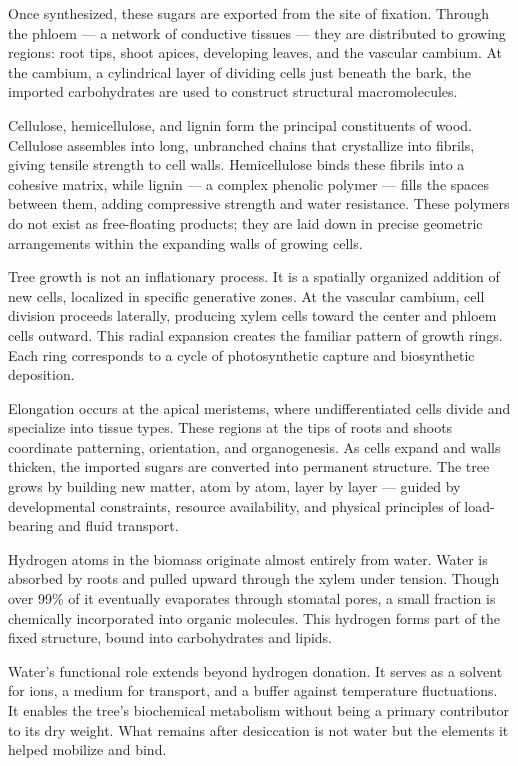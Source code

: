 Once synthesized, these sugars are exported from the site of fixation. Through the phloem — a network of conductive tissues — they are distributed to growing regions: root tips, shoot apices, developing leaves, and the vascular cambium. At the cambium, a cylindrical layer of dividing cells just beneath the bark, the imported carbohydrates are used to construct structural macromolecules.

Cellulose, hemicellulose, and lignin form the principal constituents of wood. Cellulose assembles into long, unbranched chains that crystallize into fibrils, giving tensile strength to cell walls. Hemicellulose binds these fibrils into a cohesive matrix, while lignin — a complex phenolic polymer — fills the spaces between them, adding compressive strength and water resistance. These polymers do not exist as free-floating products; they are laid down in precise geometric arrangements within the expanding walls of growing cells.

Tree growth is not an inflationary process. It is a spatially organized addition of new cells, localized in specific generative zones. At the vascular cambium, cell division proceeds laterally, producing xylem cells toward the center and phloem cells outward. This radial expansion creates the familiar pattern of growth rings. Each ring corresponds to a cycle of photosynthetic capture and biosynthetic deposition.

Elongation occurs at the apical meristems, where undifferentiated cells divide and specialize into tissue types. These regions at the tips of roots and shoots coordinate patterning, orientation, and organogenesis. As cells expand and walls thicken, the imported sugars are converted into permanent structure. The tree grows by building new matter, atom by atom, layer by layer — guided by developmental constraints, resource availability, and physical principles of load-bearing and fluid transport.

Hydrogen atoms in the biomass originate almost entirely from water. Water is absorbed by roots and pulled upward through the xylem under tension. Though over 99\% of it eventually evaporates through stomatal pores, a small fraction is chemically incorporated into organic molecules. This hydrogen forms part of the fixed structure, bound into carbohydrates and lipids.

Water’s functional role extends beyond hydrogen donation. It serves as a solvent for ions, a medium for transport, and a buffer against temperature fluctuations. It enables the tree’s biochemical metabolism without being a primary contributor to its dry weight. What remains after desiccation is not water but the elements it helped mobilize and bind.


